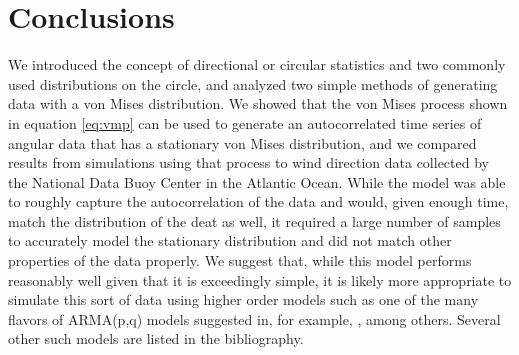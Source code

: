 \documentclass[12pt]{article}
\numberwithin{equation}{section}
\numberwithin{figure}{section}
\begin{document}
\section{Conclusions}

We introduced the concept of directional or circular statistics and two commonly used distributions on the circle, and analyzed two simple methods of generating data with a von Mises distribution. We showed that the von Mises process shown in equation \ref{eq:vmp} can be used to generate an autocorrelated time series of angular data that has a stationary von Mises distribution, and we compared results from simulations using that process to wind direction data collected by the National Data Buoy Center in the Atlantic Ocean. While the model was able to roughly capture the autocorrelation of the data and would, given enough time, match the distribution of the deat as well, it required a large number of samples to accurately model the stationary distribution and did not match other properties of the data properly. We suggest that, while this model performs reasonably well given that it is exceedingly simple, it is likely more appropriate to simulate this sort of data using higher order models such as one of the many flavors of ARMA(p,q) models suggested in, for example, \cite{Harvey}, among others. Several other such models are listed in the bibliography. 
\end{document}
